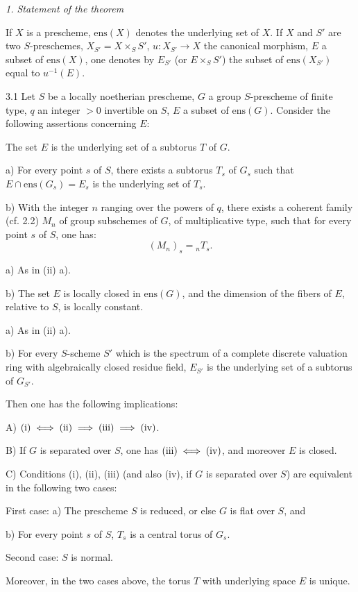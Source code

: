 \par\medskip\noindent\textit{1. Statement of the theorem}\par
\begin{notation}{}\label{XV.notation3}
If $X$ is a prescheme, $\mathrm{ens}(X)$ denotes the underlying set of $X$. If $X$ and $S'$ are two $S$-preschemes, $X_{S'}=X\times_S S'$, $u:X_{S'}\to X$ the canonical morphism, $E$ a subset of $\mathrm{ens}(X)$, one denotes by $E_{S'}$ (or $E\times_S S'$) the subset of $\mathrm{ens}(X_{S'})$ equal to $u^{-1}(E)$.
\end{notation}
\begin{theorem}{3.1}\label{XV.3.1}
Let $S$ be a locally noetherian prescheme, $G$ a group $S$-prescheme of finite type, $q$ an integer $>0$ invertible on $S$, $E$ a subset of $\mathrm{ens}(G)$. Consider the following assertions concerning $E$:
\begin{enumeratei}
\item The set $E$ is the underlying set of a subtorus $T$ of $G$.
\item a) For every point $s$ of $S$, there exists a subtorus $T_s$ of $G_s$ such that $E\cap\mathrm{ens}(G_s)=E_s$ is the underlying set of $T_s$.

b) With the integer $n$ ranging over the powers of $q$, there exists a coherent family (cf. 2.2) $M_n$ of group subschemes of $G$, of multiplicative type, such that for every point $s$ of $S$, one has:
\[
(M_n)_s={}_nT_s.
\]
\item a) As in (ii) a).

b) The set $E$ is locally closed in $\mathrm{ens}(G)$, and the dimension of the fibers of $E$, relative to $S$, is locally constant.
\item a) As in (ii) a).

b) For every $S$-scheme $S'$ which is the spectrum of a complete discrete valuation ring with algebraically closed residue field, $E_{S'}$ is the underlying set of a subtorus of $G_{S'}$.
\end{enumeratei}
Then one has the following implications:

\noindent A) $\textup{(i)}\iff\textup{(ii)}\implies\textup{(iii)}\implies\textup{(iv)}$.

\noindent B) If $G$ is separated over $S$, one has $\textup{(iii)}\iff\textup{(iv)}$, and moreover $E$ is closed.

\noindent C) Conditions (i), (ii), (iii) (and also (iv), if $G$ is separated over $S$) are equivalent in the following two cases:

\noindent First case: a) The prescheme $S$ is reduced, or else $G$ is flat over $S$, and

\hspace*{2em}b) For every point $s$ of $S$, $T_s$ is a central torus of $G_s$.

\noindent Second case: $S$ is normal.

Moreover, in the two cases above, the torus $T$ with underlying space $E$ is unique.
\end{theorem}

